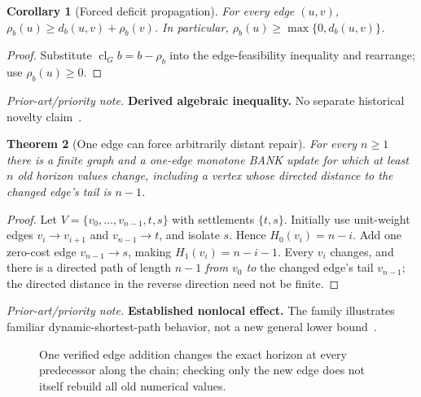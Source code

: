 \documentclass[11pt,letterpaper]{article}
\newtheorem{theorem}{Theorem}[section]
\newtheorem{corollary}[theorem]{Corollary}
\theoremstyle{definition}
\theoremstyle{remark}
\newcommand{\Cl}{\operatorname{cl}}
\newcommand{\novel}[1]{\par\begingroup\small\textit{Prior-art/priority note.} #1\par\endgroup}
\begin{document}
\begin{corollary}[Forced deficit propagation]\label{cor:propagate}
For every edge \((u,v)\), \(\rho_b(u)\ge d_b(u,v)+\rho_b(v)\). In particular, \(\rho_b(u)\ge \max\{0,d_b(u,v)\}\).
\end{corollary}
\begin{proof}
Substitute \(\Cl_Gb=b-\rho_b\) into the edge-feasibility inequality and rearrange; use \(\rho_b(u)\ge0\).
\end{proof}
\novel{\textbf{Derived algebraic inequality.} No separate historical novelty claim~\cite{Bellman,W2}.}

\begin{theorem}[One edge can force arbitrarily distant repair]\label{thm:nonlocal}
For every \(n\ge1\) there is a finite graph and a one-edge monotone BANK update for which at least \(n\) old horizon values change, including a vertex whose directed distance \emph{to} the changed edge's tail is \(n-1\).
\end{theorem}
\begin{proof}
Let \(V=\{v_0,\ldots,v_{n-1},t,s\}\) with settlements \(\{t,s\}\). Initially use unit-weight edges \(v_i\to v_{i+1}\) and \(v_{n-1}\to t\), and isolate \(s\). Hence \(H_0(v_i)=n-i\). Add one zero-cost edge \(v_{n-1}\to s\), making \(H_1(v_i)=n-i-1\). Every \(v_i\) changes, and there is a directed path of length \(n-1\) \emph{from \(v_0\) to} the changed edge's tail \(v_{n-1}\); the directed distance in the reverse direction need not be finite.
\end{proof}
\novel{\textbf{Established nonlocal effect.} The family illustrates familiar dynamic-shortest-path behavior, not a new general lower bound~\cite{Ramalingam1996,Koenig2004,Roditty2004}.}

\begin{figure}[t]
\centering
{}
\caption{One verified edge addition changes the exact horizon at every predecessor along the chain; checking only the new edge does not itself rebuild all old numerical values.}
\label{fig:shock}
\end{figure}
\end{document}
